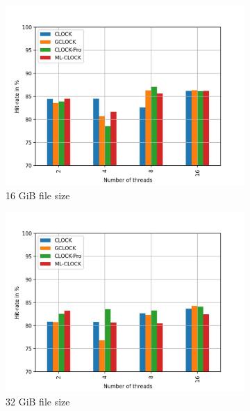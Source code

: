 \documentclass[
	12pt,
	a4paper,
	abstract,
	bibliography=totoc,
	chapterprefix,
	headings=openright,
	numbers=endperiod,
	parskip=half,
	twoside,
]{scrreprt}
\begin{document}
\begin{figure}[H]
	\centering
	\begin{subfigure}{0.4\textwidth}
		\includegraphics[width=\textwidth]{multi_16_gb_rw_50to50_zoned.jpg}		
		\caption{16 GiB file size}
		\label{fig:rw_50to50 16 zoned}
	\end{subfigure}
	\hfill
	\begin{subfigure}{0.4\textwidth}
		\includegraphics[width=\textwidth]{multi_32_gb_rw_50to50_zoned.jpg}		
		\caption{32 GiB file size}
		\label{fig:rw_50to50 32 zoned}
	\end{subfigure}
	\hfill
	\begin{subfigure}{0.4\textwidth}

\end{subfigure}
\end{figure}
\end{document}
